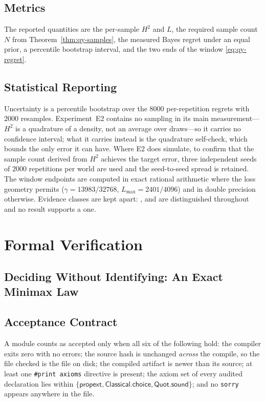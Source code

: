 \subsection{Metrics}

The reported quantities are the per-sample $H^{2}$ and $L$, the required sample count $N$
from Theorem~\ref{thm:qy-samples}, the measured Bayes regret under an equal prior, a percentile
bootstrap interval, and the two ends of the window \eqref{eq:qy-regret}.

\subsection{Statistical Reporting}

Uncertainty is a percentile bootstrap over the $8000$ per-repetition regrets with $2000$
resamples. Experiment~E2 contains no sampling in its main measurement---$H^{2}$ is a
quadrature of a density, not an average over draws---so it carries no confidence interval;
what it carries instead is the quadrature self-check, which bounds the only error it can have.
Where E2 does simulate, to confirm that the sample count derived from $H^{2}$ achieves the
target error, three independent seeds of $2000$ repetitions per world are used and the
seed-to-seed spread is retained. The window endpoints are computed in exact rational arithmetic where the loss
geometry permits ($\gamma=13983/32768$, $L_{\max}=2401/4096$) and in double precision
otherwise. Evidence classes are kept apart: \PROVED{}, \CERT{} and \NUM{} are distinguished
throughout and no \NUM{} result supports a \PROVED{} one.


\section{Formal Verification}

\subsection{Deciding Without Identifying: An Exact Minimax Law}
\label{sec:sp-verification}

\subsection{Acceptance Contract}

A module counts as accepted only when all six of the following hold: the compiler exits zero
with no errors; the source hash is unchanged \emph{across} the compile, so the file checked is
the file on disk; the compiled artifact is newer than its source; at least one
\texttt{\#print axioms} directive is present; the axiom set of every audited declaration lies
within $\{\textsf{propext},\textsf{Classical.choice},\textsf{Quot.sound}\}$; and no
\texttt{sorry} appears anywhere in the file.


